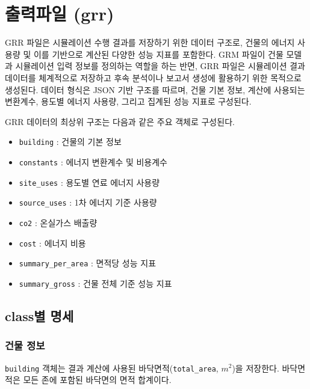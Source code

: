 
\section{출력파일 (grr)}
\label{section:format-explanation-grr}

GRR 파일은 시뮬레이션 수행 결과를 저장하기 위한 데이터 구조로, 건물의 에너지 사용량 및 이를 기반으로 계산된 다양한 성능 지표를 포함한다. GRM 파일이 건물 모델과 시뮬레이션 입력 정보를 정의하는 역할을 하는 반면, GRR 파일은 시뮬레이션 결과 데이터를 체계적으로 저장하고 후속 분석이나 보고서 생성에 활용하기 위한 목적으로 생성된다. 데이터 형식은 JSON 기반 구조를 따르며, 건물 기본 정보, 계산에 사용되는 변환계수, 용도별 에너지 사용량, 그리고 집계된 성능 지표로 구성된다.

GRR 데이터의 최상위 구조는 다음과 같은 주요 객체로 구성된다.

\begin{itemize}
\item \texttt{building} : 건물의 기본 정보
\item \texttt{constants} : 에너지 변환계수 및 비용계수
\item \texttt{site\_uses} : 용도별 연료 에너지 사용량
\item \texttt{source\_uses} : 1차 에너지 기준 사용량
\item \texttt{co2} : 온실가스 배출량
\item \texttt{cost} : 에너지 비용
\item \texttt{summary\_per\_area} : 면적당 성능 지표
\item \texttt{summary\_gross} : 건물 전체 기준 성능 지표
\end{itemize}

\subsection{class별 명세}

\subsubsection{건물 정보}

\texttt{building} 객체는 결과 계산에 사용된 바닥면적(\texttt{total\_area}, $m^2$)을 저장한다. 바닥면적은 모든 존에 포함된 바닥면의 면적 합계이다.

